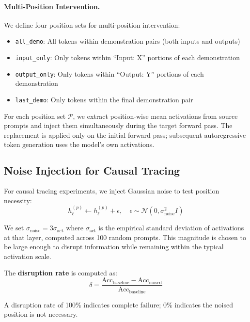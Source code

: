 \documentclass{article}
\begin{document}
\paragraph{Multi-Position Intervention.} We define four position sets for multi-position intervention:
\begin{itemize}
    \item \texttt{all\_demo}: All tokens within demonstration pairs (both inputs and outputs)
    \item \texttt{input\_only}: Only tokens within ``Input: X'' portions of each demonstration
    \item \texttt{output\_only}: Only tokens within ``Output: Y'' portions of each demonstration
    \item \texttt{last\_demo}: Only tokens within the final demonstration pair
\end{itemize}

For each position set $\mathcal{P}$, we extract position-wise mean activations from source prompts and inject them simultaneously during the target forward pass. The replacement is applied only on the initial forward pass; subsequent autoregressive token generation uses the model's own activations.

\subsection{Noise Injection for Causal Tracing}

For causal tracing experiments, we inject Gaussian noise to test position necessity:
\begin{equation}
    h_\ell^{(p)} \leftarrow h_\ell^{(p)} + \epsilon, \quad \epsilon \sim \mathcal{N}(0, \sigma_\text{noise}^2 I)
\end{equation}

We set $\sigma_\text{noise} = 3\sigma_\text{act}$ where $\sigma_\text{act}$ is the empirical standard deviation of activations at that layer, computed across 100 random prompts. This magnitude is chosen to be large enough to disrupt information while remaining within the typical activation scale.

The \textbf{disruption rate} is computed as:
\begin{equation}
    \delta = \frac{\text{Acc}_\text{baseline} - \text{Acc}_\text{noised}}{\text{Acc}_\text{baseline}}
\end{equation}

A disruption rate of 100\% indicates complete failure; 0\% indicates the noised position is not necessary.
\end{document}
